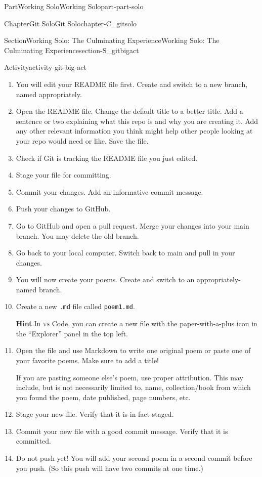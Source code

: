 \documentclass[twoside,10pt,]{book}
\newcommand{\blocktitlefont}{\relax}
\newcommand{\mono}[1]{\texttt{#1}}
\newcommand{\initialism}[1]{\textsc{\MakeLowercase{#1}}}
\begin{document}
\begin{partptx}{Part}{Working Solo}{}{Working Solo}{}{}{part-part-solo}
\begin{chapterptx}{Chapter}{Git Solo}{}{Git Solo}{}{}{chapter-C_gitsolo}
\begin{sectionptx}{Section}{Working Solo: The Culminating Experience}{}{Working Solo: The Culminating Experience}{}{}{section-S_gitbigact}
\begin{activity}{Activity}{}{activity-git-big-act}
\begin{enumerate}[font=\bfseries,label=(\alph*),ref=\alph*]
\noindent\textbf{\blocktitlefont Hint}.\label{hint-git-ba-clone-b}{}\hypertarget{hint-git-ba-clone-b}{}\quad{}Make sure you are not ``inside'' your previous repositories. Nested repositories will not work. So \mono{cd} to the folder in which you want to place your new repo.%
\item{}You will edit your README file first. Create and switch to a new branch, named appropriately.%
\item{}Open the README file. Change the default title to a better title. Add a sentence or two explaining what this repo is and why you are creating it. Add any other relevant information you think might help other people looking at your repo would need or like. Save the file.%
\item{}Check if Git is tracking the README file you just edited.%
\item{}Stage your file for committing.%
\item{}Commit your changes. Add an informative commit message.%
\item{}Push your changes to GitHub.%
\item{}Go to GitHub and open a pull request. Merge your changes into your main branch. You may delete the old branch.%
\item{}Go back to your local computer. Switch back to main and pull in your changes.%
\item{}You will now create your poems. Create and switch to an appropriately-named branch.%
\item{}Create a new \mono{.md} file called \mono{poem1.md}.%
\par\smallskip%
\noindent\textbf{\blocktitlefont Hint}.\label{hint-git-big-act-m-b}{}\hypertarget{hint-git-big-act-m-b}{}\quad{}In \initialism{VS} Code, you can create a new file with the paper-with-a-plus icon in the ``Explorer'' panel in the top left.%
\item{}Open the file and use Markdown to write one original poem or paste one of your favorite poems. Make sure to add a title!%
\par
If you are pasting someone else's poem, use proper attribution. This may include, but is not necessarily limited to, name, collection\slash{}book from which you found the poem, date published, page numbers, etc.%
\item{}Stage your new file. Verify that it is in fact staged.%
\item{}Commit your new file with a good commit message. Verify that it is committed.%
\item{}Do not push yet! You will add your second poem in a second commit before you push. (So this push will have two commits at one time.)%

\end{enumerate}
\end{activity}
\end{sectionptx}
\end{chapterptx}
\end{partptx}
\end{document}
